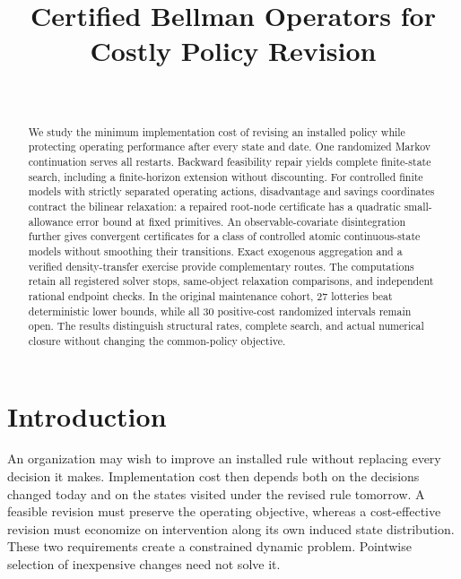 



\begin{frontmatter}
\title{Certified Bellman Operators for Costly Policy Revision}
\begin{aug}\author[id=au1,addressref={add1}]{~}\address[id=add1]{}\end{aug}
\begin{abstract}
We study the minimum implementation cost of revising an installed policy while protecting operating performance after every state and date. One randomized Markov continuation serves all restarts. Backward feasibility repair yields complete finite-state search, including a finite-horizon extension without discounting. For controlled finite models with strictly separated operating actions, disadvantage and savings coordinates contract the bilinear relaxation: a repaired root-node certificate has a quadratic small-allowance error bound at fixed primitives. An observable-covariate disintegration further gives convergent certificates for a class of controlled atomic continuous-state models without smoothing their transitions. Exact exogenous aggregation and a verified density-transfer exercise provide complementary routes. The computations retain all registered solver stops, same-object relaxation comparisons, and independent rational endpoint checks. In the original maintenance cohort, 27 lotteries beat deterministic lower bounds, while all 30 positive-cost randomized intervals remain open. The results distinguish structural rates, complete search, and actual numerical closure without changing the common-policy objective.
\end{abstract}
\begin{keyword}\end{keyword}
\end{frontmatter}

\section{Introduction}\label{sec:introduction}
An organization may wish to improve an installed rule without replacing every decision it makes. Implementation cost then depends both on the decisions changed today and on the states visited under the revised rule tomorrow. A feasible revision must preserve the operating objective, whereas a cost-effective revision must economize on intervention along its own induced state distribution. These two requirements create a constrained dynamic problem. Pointwise selection of inexpensive changes need not solve it.

